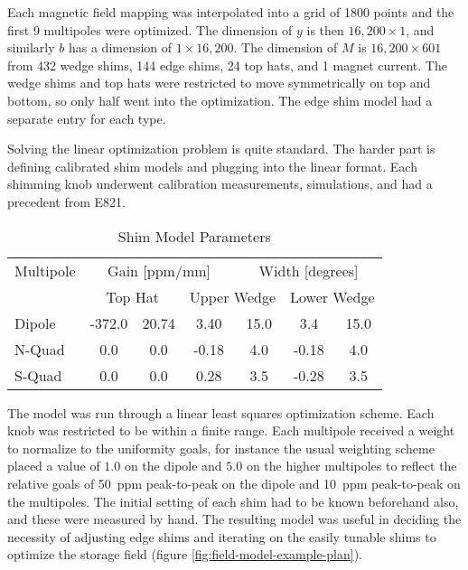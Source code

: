 Each magnetic field mapping was interpolated into a grid of 1800 points and the first 9 multipoles were optimized. The dimension of $y$ is then $16,200 \times 1$, and similarly $b$ has a dimension of $1 \times 16,200$. The dimension of $M$ is $16,200 \times 601$ from 432 wedge shims, 144 edge shims, 24 top hats, and 1 magnet current.  The wedge shims and top hats were restricted to move symmetrically on top and bottom, so only half went into the optimization.  The edge shim model had a separate entry for each type.

Solving the linear optimization problem is quite standard.  The harder part is defining calibrated shim models and plugging into the linear format. Each shimming knob underwent calibration measurements, simulations, and had a precedent from E821.

\begin{table}[h]
\label{tab:shim-model-params}
\caption{Shim Model Parameters}
\centering
\begin{tabular}{| l | c c | c c | c c |}
    \hline
    Multipole & \multicolumn{3}{c}{Gain [ppm/mm]} & \multicolumn{3}{c}{Width [degrees]} \vline \\
    & \multicolumn{2}{c}{Top Hat} & \multicolumn{2}{c}{Upper Wedge} & \multicolumn{2}{c}{Lower Wedge} \vline \\
    \hline
    Dipole & -372.0 & 20.74 & 3.40  & 15.0  & 3.4 & 15.0 \\
    N-Quad & 0.0    & 0.0   & -0.18 & 4.0 & -0.18 & 4.0  \\
    S-Quad & 0.0    & 0.0   & 0.28  & 3.5 & -0.28 & 3.5  \\
    \hline
\end{tabular}
\end{table}

The model was run through a linear least squares optimization scheme.  Each knob was restricted to be within a finite range.  Each multipole received a weight to normalize to the uniformity goals, for instance the usual weighting scheme placed a value of $1.0$ on the dipole and $5.0$ on the higher multipoles to reflect the relative goals of \SI{50}{ppm} peak-to-peak on the dipole and \SI{10}{ppm} peak-to-peak on the multipoles.  The initial setting of each shim had to be known beforehand also, and these were measured by hand.  The resulting model was useful in deciding the necessity of adjusting edge shims and iterating on the easily tunable shims to optimize the storage field (figure \ref{fig:field-model-example-plan}).

